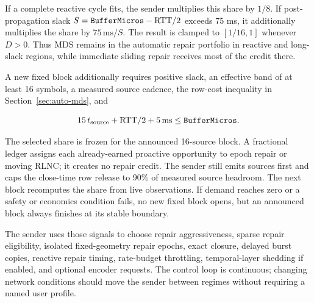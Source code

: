 \documentclass[11pt]{article}
\newcommand{\code}[1]{\ifmmode\text{\texttt{#1}}\else\texttt{#1}\fi}
\newcommand{\field}[1]{\code{#1}}
\begin{document}
If a complete reactive cycle fits, the sender multiplies this share by $1/8$.
If post-propagation slack $S=\field{BufferMicros}-\mathrm{RTT}/2$ exceeds 75 ms,
it additionally multiplies the share by $75\,\mathrm{ms}/S$. The result is
clamped to $[1/16,1]$ whenever $D>0$. Thus MDS remains in the automatic repair
portfolio in reactive and long-slack regions, while immediate sliding repair
receives most of the credit there.

A new fixed block additionally requires positive slack, an effective band of at
least 16 symbols, a measured source cadence, the row-cost inequality in
Section~\ref{sec:auto-mds}, and

\[
  15\,t_{\mathrm{source}} + \mathrm{RTT}/2 + 5\,\mathrm{ms}
  \leq \field{BufferMicros}.
\]

The selected share is frozen for the announced 16-source block. A fractional
ledger assigns each already-earned proactive opportunity to epoch repair or moving
RLNC; it creates no repair credit. The sender still emits sources first and caps
the close-time row release to 90\% of measured source headroom. The next block
recomputes the share from live observations. If demand reaches zero or a safety
or economics condition fails, no new fixed block opens, but an announced block
always finishes at its stable boundary.

The sender uses those signals to choose repair aggressiveness, sparse repair
eligibility, isolated fixed-geometry repair epochs, exact closure, delayed burst copies,
reactive repair timing,
rate-budget throttling, temporal-layer shedding if enabled, and optional encoder
requests. The control loop is continuous; changing network conditions should
move the sender between regimes without requiring a named user profile.
\end{document}
